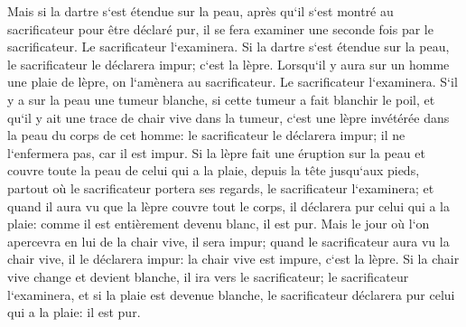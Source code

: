 \verse Mais si la dartre s`est étendue sur la peau, après qu`il s`est montré au sacrificateur pour être déclaré pur, il se fera examiner une seconde fois par le sacrificateur. 
\verse Le sacrificateur l`examinera. Si la dartre s`est étendue sur la peau, le sacrificateur le déclarera impur; c`est la lèpre. 
\verse Lorsqu`il y aura sur un homme une plaie de lèpre, on l`amènera au sacrificateur. 
\verse Le sacrificateur l`examinera. S`il y a sur la peau une tumeur blanche, si cette tumeur a fait blanchir le poil, et qu`il y ait une trace de chair vive dans la tumeur, 
\verse c`est une lèpre invétérée dans la peau du corps de cet homme: le sacrificateur le déclarera impur; il ne l`enfermera pas, car il est impur. 
\verse Si la lèpre fait une éruption sur la peau et couvre toute la peau de celui qui a la plaie, depuis la tête jusqu`aux pieds, partout où le sacrificateur portera ses regards, le sacrificateur l`examinera; 
\verse et quand il aura vu que la lèpre couvre tout le corps, il déclarera pur celui qui a la plaie: comme il est entièrement devenu blanc, il est pur. 
\verse Mais le jour où l`on apercevra en lui de la chair vive, il sera impur; 
\verse quand le sacrificateur aura vu la chair vive, il le déclarera impur: la chair vive est impure, c`est la lèpre. 
\verse Si la chair vive change et devient blanche, il ira vers le sacrificateur; 
\verse le sacrificateur l`examinera, et si la plaie est devenue blanche, le sacrificateur déclarera pur celui qui a la plaie: il est pur. 
